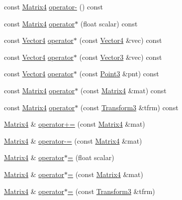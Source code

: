 \begin{DoxyCompactItemize}
const \hyperlink{classVectormath_1_1Aos_1_1Matrix4}{Matrix4} \hyperlink{classVectormath_1_1Aos_1_1Matrix4_ab7f05537a209295cf6c54468cb90d503}{operator-\/} () const 
\item 
const \hyperlink{classVectormath_1_1Aos_1_1Matrix4}{Matrix4} \hyperlink{classVectormath_1_1Aos_1_1Matrix4_a3582bed80cf3b5882d7b14a3841ded36}{operator$\ast$} (float scalar) const 
\item 
const \hyperlink{classVectormath_1_1Aos_1_1Vector4}{Vector4} \hyperlink{classVectormath_1_1Aos_1_1Matrix4_a58532fc2be06849ee219c380221142cc}{operator$\ast$} (const \hyperlink{classVectormath_1_1Aos_1_1Vector4}{Vector4} \&vec) const 
\item 
const \hyperlink{classVectormath_1_1Aos_1_1Vector4}{Vector4} \hyperlink{classVectormath_1_1Aos_1_1Matrix4_a0d972b51bbf8abcb3df3be5760305a58}{operator$\ast$} (const \hyperlink{classVectormath_1_1Aos_1_1Vector3}{Vector3} \&vec) const 
\item 
const \hyperlink{classVectormath_1_1Aos_1_1Vector4}{Vector4} \hyperlink{classVectormath_1_1Aos_1_1Matrix4_aaaa78b99b6c3db990e5292392e5fb4d0}{operator$\ast$} (const \hyperlink{classVectormath_1_1Aos_1_1Point3}{Point3} \&pnt) const 
\item 
const \hyperlink{classVectormath_1_1Aos_1_1Matrix4}{Matrix4} \hyperlink{classVectormath_1_1Aos_1_1Matrix4_accbcaf900e4cf6c75779d0670d706c38}{operator$\ast$} (const \hyperlink{classVectormath_1_1Aos_1_1Matrix4}{Matrix4} \&mat) const 
\item 
const \hyperlink{classVectormath_1_1Aos_1_1Matrix4}{Matrix4} \hyperlink{classVectormath_1_1Aos_1_1Matrix4_a3c729758e4a3fa24690bd313a4018e4d}{operator$\ast$} (const \hyperlink{classVectormath_1_1Aos_1_1Transform3}{Transform3} \&tfrm) const 
\item 
\hyperlink{classVectormath_1_1Aos_1_1Matrix4}{Matrix4} \& \hyperlink{classVectormath_1_1Aos_1_1Matrix4_ac16ba820d1415dff7021b580e7402194}{operator+=} (const \hyperlink{classVectormath_1_1Aos_1_1Matrix4}{Matrix4} \&mat)
\item 
\hyperlink{classVectormath_1_1Aos_1_1Matrix4}{Matrix4} \& \hyperlink{classVectormath_1_1Aos_1_1Matrix4_a3f4aff0dc945d49e0299241eb9ac3111}{operator-\/=} (const \hyperlink{classVectormath_1_1Aos_1_1Matrix4}{Matrix4} \&mat)
\item 
\hyperlink{classVectormath_1_1Aos_1_1Matrix4}{Matrix4} \& \hyperlink{classVectormath_1_1Aos_1_1Matrix4_a9026d1416ff16638222e6117f5318e28}{operator$\ast$=} (float scalar)
\item 
\hyperlink{classVectormath_1_1Aos_1_1Matrix4}{Matrix4} \& \hyperlink{classVectormath_1_1Aos_1_1Matrix4_abc9cd8b2d92794826c7b5f4b1fc8b3cb}{operator$\ast$=} (const \hyperlink{classVectormath_1_1Aos_1_1Matrix4}{Matrix4} \&mat)
\item 
\hyperlink{classVectormath_1_1Aos_1_1Matrix4}{Matrix4} \& \hyperlink{classVectormath_1_1Aos_1_1Matrix4_a7a8def7df1085d4e00f6acb43939dd41}{operator$\ast$=} (const \hyperlink{classVectormath_1_1Aos_1_1Transform3}{Transform3} \&tfrm)
\end{DoxyCompactItemize}
